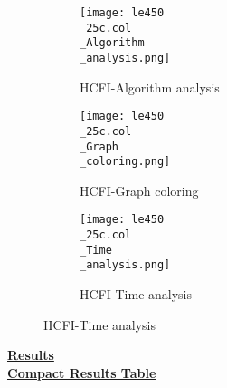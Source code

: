 \documentclass[10pt]{article}
\begin{document}
\graphicspath{{./Core1/Solutions/HCFI/le450\_25c.col}}
\begin{figure}[H]
\begin{subfigure}{.33\textwidth}
  \centering
  \texttt{[image: le450\\\_25c.col\\\_Algorithm\\\_analysis.png]}
  \caption{HCFI-Algorithm analysis}
   \label{fig:subfig1}
\end{subfigure}%
\begin{subfigure}{.33\textwidth}
  \centering
  \texttt{[image: le450\\\_25c.col\\\_Graph\\\_coloring.png]}
  \caption{HCFI-Graph coloring}
  \label{fig:subfig2}
\end{subfigure}
\begin{subfigure}{.33\textwidth}
  \centering
  \texttt{[image: le450\\\_25c.col\\\_Time\\\_analysis.png]}
  \caption{HCFI-Time analysis}
  \end{subfigure}
\end{figure}
\vspace{2cm}
\begin{center}
\hyperlink{page.8}{\textbf{Results}}\\
\vspace{0.5cm}
\hyperlink{page.71}{\textbf{Compact Results Table}}
\end{center}
\pagebreak
\end{document}
